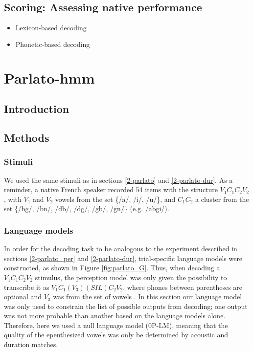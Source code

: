 \subsection{Scoring: Assessing native performance}
\begin{itemize}
\item Lexicon-based decoding
\item Phonetic-based decoding
\end{itemize}


\section{{\color{red}Parlato-hmm}} \label{3-parlato-hmm}
\subsection{Introduction}
\subsection{Methods}
\subsubsection{Stimuli}
We used the same stimuli as in sections \ref{2-parlato} and \ref{2-parlato-dur}. As a reminder, a native French speaker recorded 54 items with the structure $V_{1}C_{1}C_{2}V_{2}$, with $V_{1}$ and $V_{2}$ vowels from the set \{/a/, /i/, /u/\}, and $C_{1}C_{2}$ a cluster from the set \{/bg/, /bn/, /db/, /dg/, /gb/, /gn/\} (e.g. /abgi/).

\subsubsection{Language models}
In order for the decoding task to be analogous to the experiment described in sections \ref{2-parlato_per} and \ref{2-parlato-dur}, trial-specific language models were constructed, as shown in Figure \ref{fig:parlato_G}. Thus, when decoding a $V_{1}C_{1}C_{2}V_{2}$ stimulus, the perception model was only given the possibility to transcribe it as $V_{1}C_{1}(V_{3})(SIL)C_{2}V_{2}$, where phones between parentheses are optional and $V_{3}$ was from the set of vowels . In this section our language model was only used to constrain the list of possible outputs from decoding; one output was not more probable than another based on the language models alone. Therefore, here we used a null language model (\textsc{0P-LM}), meaning that the quality of the epenthesized vowels was only be determined by acoustic and duration matches.

